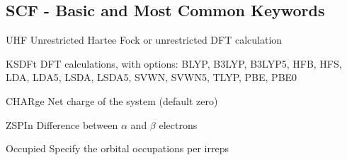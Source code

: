 \subsection{SCF - Basic and Most Common Keywords}
\begin{keywordlist}
\item[UHF] Unrestricted Hartee Fock or unrestricted DFT calculation
\item[KSDFt] DFT calculations, with options: BLYP, B3LYP, B3LYP5, HFB, HFS, 
LDA, LDA5, LSDA, LSDA5, SVWN, SVWN5, TLYP, PBE, PBE0
\item[CHARge] Net charge of the system (default zero)
\item[ZSPIn] Difference between $\alpha$ and $\beta$ electrons
\item[Occupied] Specify the orbital occupations per irreps
\item[]
\end{keywordlist}
